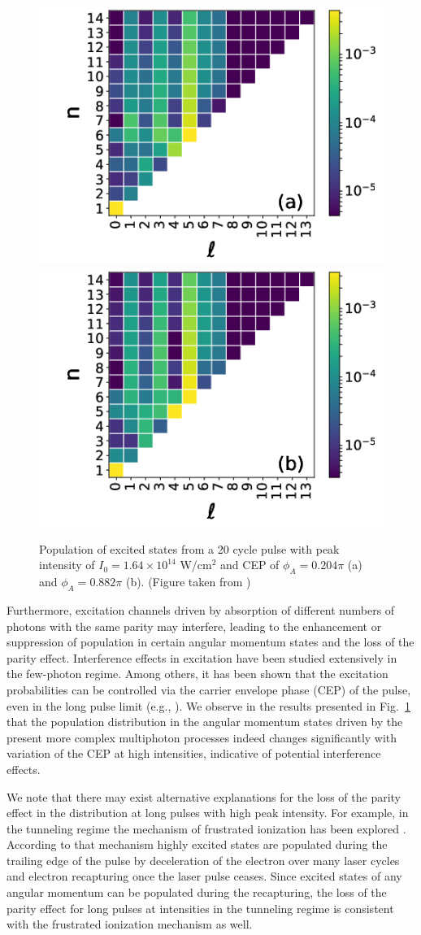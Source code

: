 \begin{figure}[!ht]
\centering
\includegraphics[width=0.32\columnwidth]{figs/Rydberg/heat_cep_test_0p102_20_cyc_16p4e13.png}
\includegraphics[width=0.32\columnwidth]{figs/Rydberg/heat_cep_test_0p441_20_cyc_16p4e13.png}
\caption{\label{fig:CEP_Effects_20_cyc}
Population of excited states from a 20 cycle pulse with peak intensity of $I_0 = 1.64 \times 10^{14}$ W/cm$^2$ and CEP of $\phi_A=0.204\pi$ (a) and $\phi_A=0.882\pi$ (b). (Figure taken from \cite{venzke2018_ryd})}
\end{figure}

Furthermore, excitation channels driven by absorption of different numbers of photons with the same parity may interfere, leading to the enhancement or suppression of population in certain angular momentum states and the loss of the parity effect. Interference effects in excitation have been studied extensively in the few-photon regime. Among others, it has been shown that the excitation probabilities can be controlled via the carrier envelope phase (CEP) of the pulse, even in the long pulse limit (e.g., \cite{zhao2013,zhao2014}). We observe in the results presented in Fig.\ \ref{fig:CEP_Effects_20_cyc} that the population distribution in the angular momentum states driven by the present more complex multiphoton processes indeed changes significantly with variation of the CEP at high intensities, indicative of potential interference effects.

We note that there may exist alternative explanations for the loss of the parity effect in the distribution at long pulses with high peak intensity. For example, in the tunneling regime the mechanism of frustrated ionization has been explored \cite{nubbemeyer2008}. According to that mechanism highly excited states are populated during the trailing edge of the pulse by deceleration of the electron over many laser cycles and electron recapturing once the laser pulse ceases. Since excited states of any angular momentum can be populated during the recapturing, the loss of the parity effect for long pulses at intensities in the tunneling regime is consistent with the frustrated ionization mechanism as well.

